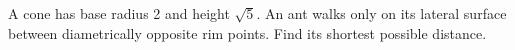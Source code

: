 A cone has base radius 2 and height $\sqrt5$. An ant walks only on its lateral surface between diametrically opposite rim points. Find its shortest possible distance.
